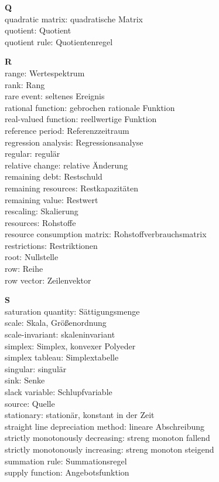 \medskip
\noindent
{\bf Q}\\
quadratic matrix: quadratische Matrix\\
quotient: Quotient\\
quotient rule: Quotientenregel

\medskip
\noindent
{\bf R}\\
range: Wertespektrum\\
rank: Rang\\
rare event: seltenes Ereignis\\
rational function: gebrochen rationale Funktion\\
real-valued function: reellwertige Funktion\\
reference period: Referenzzeitraum\\
regression analysis: Regressionsanalyse\\
regular: regul\"ar\\
relative change: relative \"Anderung\\
remaining debt: Restschuld\\
remaining resources: Restkapazit\"aten\\
remaining value: Restwert\\
rescaling: Skalierung\\
resources: Rohstoffe\\
resource consumption matrix: Rohstoffverbrauchsmatrix\\
restrictions: Restriktionen\\
root: Nullstelle\\
row: Reihe\\
row vector: Zeilenvektor

\medskip
\noindent
{\bf S}\\
saturation quantity: S\"attigungsmenge\\
scale: Skala, Gr\"o\ss enordnung\\
scale-invariant: skaleninvariant\\
simplex: Simplex, konvexer Polyeder\\
simplex tableau: Simplextabelle\\
singular: singul\"ar\\
sink: Senke\\
slack variable: Schlupfvariable\\
source: Quelle\\
stationary: station\"ar, konstant in der Zeit\\
straight line depreciation method: lineare Abschreibung\\
strictly monotonously decreasing: streng monoton fallend\\
strictly monotonously increasing: streng monoton steigend\\
summation rule: Summationsregel\\
supply function: Angebotsfunktion

